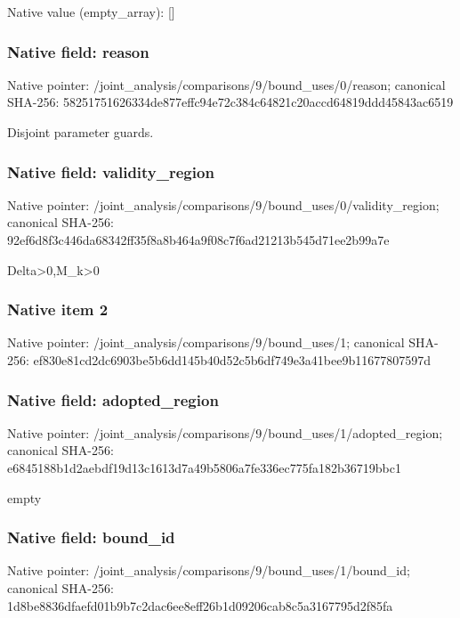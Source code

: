 \documentclass[10pt,a4paper]{article}
\begin{document}
Native value (empty\_\allowbreak{}array): []

\subsubsection{Native field: reason}
Native pointer: /joint\_\allowbreak{}analysis/comparisons/9/bound\_\allowbreak{}uses/0/reason; canonical SHA-256: 58251751626334de877effc94e72c384c64821c20accd64819ddd45843ac6519

\begingroup\raggedright\sloppy Disjoint parameter guards.\par\endgroup

\subsubsection{Native field: validity\_\allowbreak{}region}
Native pointer: /joint\_\allowbreak{}analysis/comparisons/9/bound\_\allowbreak{}uses/0/validity\_\allowbreak{}region; canonical SHA-256: 92ef6d8f3c446da68342ff35f8a8b464a9f08c7f6ad21213b545d71ee2b99a7e

\begingroup\raggedright\sloppy Delta>0,\allowbreak{}M\_\allowbreak{}k>0\par\endgroup

\subsubsection{Native item 2}
Native pointer: /joint\_\allowbreak{}analysis/comparisons/9/bound\_\allowbreak{}uses/1; canonical SHA-256: ef830e81cd2dc6903be5b6dd145b40d52c5b6df749e3a41bee9b11677807597d

\subsubsection{Native field: adopted\_\allowbreak{}region}
Native pointer: /joint\_\allowbreak{}analysis/comparisons/9/bound\_\allowbreak{}uses/1/adopted\_\allowbreak{}region; canonical SHA-256: e6845188b1d2aebdf19d13c1613d7a49b5806a7fe336ec775fa182b36719bbc1

\begingroup\raggedright\sloppy empty\par\endgroup

\subsubsection{Native field: bound\_\allowbreak{}id}
Native pointer: /joint\_\allowbreak{}analysis/comparisons/9/bound\_\allowbreak{}uses/1/bound\_\allowbreak{}id; canonical SHA-256: 1d8be8836dfaefd01b9b7c2dac6ee8eff26b1d09206cab8c5a3167795d2f85fa
\end{document}
